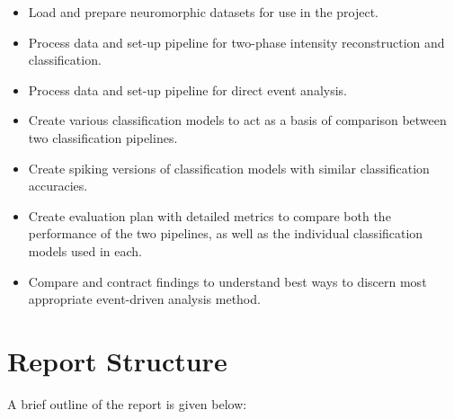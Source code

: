 \begin{itemize}
      \item Load and prepare neuromorphic datasets for use in the project.
      \item Process data and set-up pipeline for two-phase intensity reconstruction and classification.
      \item Process data and set-up pipeline for direct event analysis.
      \item Create various classification models to act as a basis of comparison between two classification pipelines.
      \item Create spiking versions of classification models with similar classification accuracies.
      \item Create evaluation plan with detailed metrics to compare both the performance of the two pipelines, as well as the individual classification models used in each.
      \item Compare and contract findings to understand best ways to discern most appropriate event-driven analysis method.
\end{itemize}

\section{Report Structure}

A brief outline of the report is given below:

